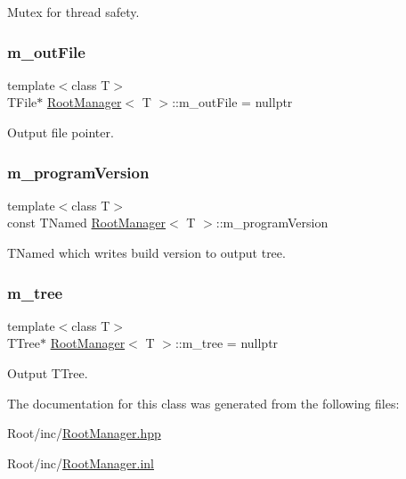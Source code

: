 Mutex for thread safety. 

\mbox{\label{class_root_manager_a2f0257574f0eeac21c3628058a5d6ad9}} 
\subsubsection{\texorpdfstring{m\+\_\+out\+File}{m\_outFile}}
{\footnotesize\ttfamily template$<$class T$>$ \\
T\+File$\ast$ \hyperlink{class_root_manager}{Root\+Manager}$<$ T $>$\+::m\+\_\+out\+File = nullptr\hspace{0.3cm}{\ttfamily [private]}}



Output file pointer. 

\mbox{\label{class_root_manager_a14d81290e5a98ec6f62459f1016e7dcc}} 
\subsubsection{\texorpdfstring{m\+\_\+program\+Version}{m\_programVersion}}
{\footnotesize\ttfamily template$<$class T$>$ \\
const T\+Named \hyperlink{class_root_manager}{Root\+Manager}$<$ T $>$\+::m\+\_\+program\+Version\hspace{0.3cm}{\ttfamily [private]}}



T\+Named which writes build version to output tree. 

\mbox{\label{class_root_manager_adfbcbba0248787d08a230508bb4136a6}} 
\subsubsection{\texorpdfstring{m\+\_\+tree}{m\_tree}}
{\footnotesize\ttfamily template$<$class T$>$ \\
T\+Tree$\ast$ \hyperlink{class_root_manager}{Root\+Manager}$<$ T $>$\+::m\+\_\+tree = nullptr\hspace{0.3cm}{\ttfamily [protected]}}



Output T\+Tree. 



The documentation for this class was generated from the following files\+:\begin{DoxyCompactItemize}
\item 
Root/inc/\hyperlink{_root_manager_8hpp}{Root\+Manager.\+hpp}\item 
Root/inc/\hyperlink{_root_manager_8inl}{Root\+Manager.\+inl}\end{DoxyCompactItemize}
